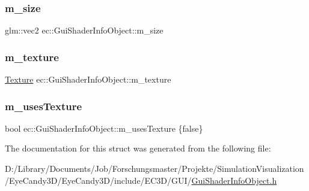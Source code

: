 \subsubsection{\texorpdfstring{m\+\_\+size}{m\_size}}
{\footnotesize\ttfamily glm\+::vec2 ec\+::\+Gui\+Shader\+Info\+Object\+::m\+\_\+size}

\mbox{\label{structec_1_1_gui_shader_info_object_a80f6058638a7da161d3f30cdb771355c}} 
\subsubsection{\texorpdfstring{m\+\_\+texture}{m\_texture}}
{\footnotesize\ttfamily \mbox{\hyperlink{classec_1_1_texture}{Texture}} ec\+::\+Gui\+Shader\+Info\+Object\+::m\+\_\+texture}

\mbox{\label{structec_1_1_gui_shader_info_object_af9f670fe1830664d40f9f9349be47ac5}} 
\subsubsection{\texorpdfstring{m\+\_\+uses\+Texture}{m\_usesTexture}}
{\footnotesize\ttfamily bool ec\+::\+Gui\+Shader\+Info\+Object\+::m\+\_\+uses\+Texture \{false\}}



The documentation for this struct was generated from the following file\+:\begin{DoxyCompactItemize}
\item 
D\+:/\+Library/\+Documents/\+Job/\+Forschungsmaster/\+Projekte/\+Simulation\+Visualization/\+Eye\+Candy3\+D/\+Eye\+Candy3\+D/include/\+E\+C3\+D/\+G\+U\+I/\mbox{\hyperlink{_gui_shader_info_object_8h}{Gui\+Shader\+Info\+Object.\+h}}\end{DoxyCompactItemize}
